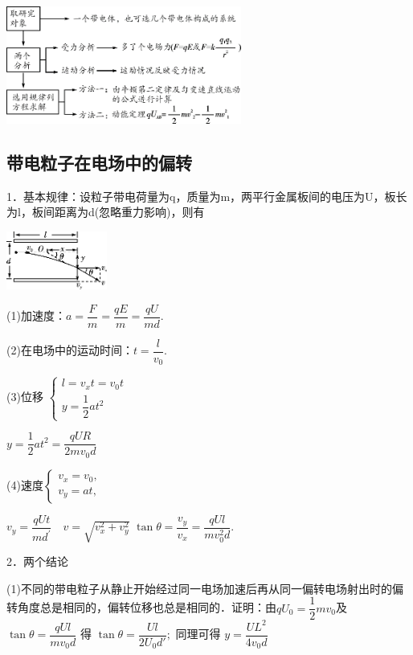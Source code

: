 \documentclass[cn,10.5pt,chinese,mac,chinesefont=founder]{elegantbook}
\begin{document}
\begin{center}\includegraphics[width=3.04167in,height=1.52083in]{media/image298.png}\end{center}
\newpage
\subsection{带电粒子在电场中的偏转}

1．基本规律：设粒子带电荷量为q，质量为m，两平行金属板间的电压为U，板长为l，板间距离为d(忽略重力影响)，则有

\begin{center}\includegraphics[width=1.30208in,height=0.75in]{media/image299.png}\end{center}

(1)加速度：$a=\dfrac{F}{m}=\dfrac{q E}{m}=\dfrac{q U}{m d}$.

(2)在电场中的运动时间：$t=\dfrac{l}{v_{0}}$.

(3)位移
$\left\{\begin{array}{l}l=v_{x} t=v_{0} t \\ y=\dfrac{1}{2} a t^2\end{array}\right.$

$y=\dfrac{1}{2} a t^{2}=\dfrac{q U R}{2 m v_{0} d}$

(4)速度$\left\{\begin{array}{l}v_{x}=v_{0}, \quad  \\ v_{y}=a t, \quad\end{array}\right.$

$v_{y}=\dfrac{q U t}{m d^{\prime}} \quad v=\sqrt{v_{x}^{2}+v_{y}^{2}}$\quad
$\tan \theta=\dfrac{v_{y}}{v_{x}}=\dfrac{q U l}{m v_{0}^{2} d}$.

2．两个结论

(1)不同的带电粒子从静止开始经过同一电场加速后再从同一偏转电场射出时的偏转角度总是相同的，偏转位移也总是相同的．证明：由$q U_{0}=\dfrac{1}{2} m v_{0}$及$\tan \theta=\dfrac{q U l}{m v_{0} d}$ 得 $\tan \theta=\dfrac{U l}{2 U_{0} d'} ;$ 同理可得 $y=\dfrac{U L^{2}}{4 v_{0} d}$
\end{document}
